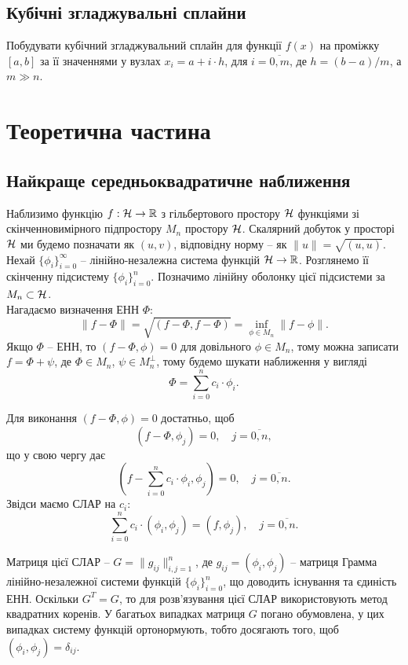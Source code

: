 \subsection{Кубічні згладжувальні сплайни}

Побудувати кубічний згладжувальний  сплайн для функції $f(x)$ на проміжку $[a, b]$ за її значеннями у вузлах $x_i = a + i \cdot h$, для $i = \overline{0, m}$, де $h = (b - a) / m$, а $m \gg n$.

\section{Теоретична частина}

\subsection{Найкраще середньоквадратичне наближення}

Наблизимо функцію $f: \mathcal{H} \to \mathbb{R}$ з гільбертового простору $\mathcal{H}$ функціями зі скінченновимірного підпростору $M_n$ простору $\mathcal{H}$. Скалярний добуток у просторі $\mathcal{H}$ ми будемо позначати як $(u, v)$, відповідну норму -- як $\|u\| = \sqrt{(u, u)}$. \\

Нехай $\{\phi_i\}_{i=0}^\infty$ -- лінійно-незалежна система функцій $\mathcal{H} \to \mathbb{R}$. Розглянемо її скінченну підсистему $\{\phi_i\}_{i=0}^n$. Позначимо лінійну оболонку цієї підсистеми за $M_n \subset \mathcal{H}$. \\

Нагадаємо визначення ЕНН $\Phi$: \[ \|f - \Phi\| = \sqrt{(f - \Phi, f - \Phi)} = \inf_{\phi \in M_n} \|f - \phi\|. \] Якщо $\Phi$ -- ЕНН, то $(f - \Phi, \phi) = 0$ для довільного $\phi \in M_n$, тому можна записати $f = \Phi + \psi$, де $\Phi \in M_n$, $\psi \in M_n^\perp$, тому будемо шукати наближення у вигляді \[ \Phi = \sum_{i = 0}^n c_i \cdot \phi_i. \]

Для виконання $(f - \Phi, \phi) = 0$ достатньо, щоб \[ (f - \Phi, \phi_j) = 0, \quad j = \overline{0, n}, \] що у свою чергу дає \[ \left(f - \sum_{i = 0}^n c_i \cdot \phi_i, \phi_j \right) = 0, \quad j = \overline{0, n}. \] Звідси маємо СЛАР на $c_i$: \[ \sum_{i=0}^n c_i \cdot (\phi_i, \phi_j) = (f, \phi_j), \quad j = \overline{0, n}. \]

Матриця цієї СЛАР -- $G = \|g_{ij}\|_{i,j=1}^{n}$, де $g_{ij} = (\phi_i, \phi_j)$ -- матриця Грамма лінійно-незалежної системи функцій $\{\phi_i\}_{i=0}^n$, що доводить існування та єдиність ЕНН. Оскільки $G^T = G$, то для розв'язування цієї СЛАР використовують метод квадратних коренів. У багатьох випадках матриця $G$ погано обумовлена, у цих випадках систему функцій ортонормують, тобто досягають того, щоб $(\phi_i, \phi_j) = \delta_{ij}$. \\

